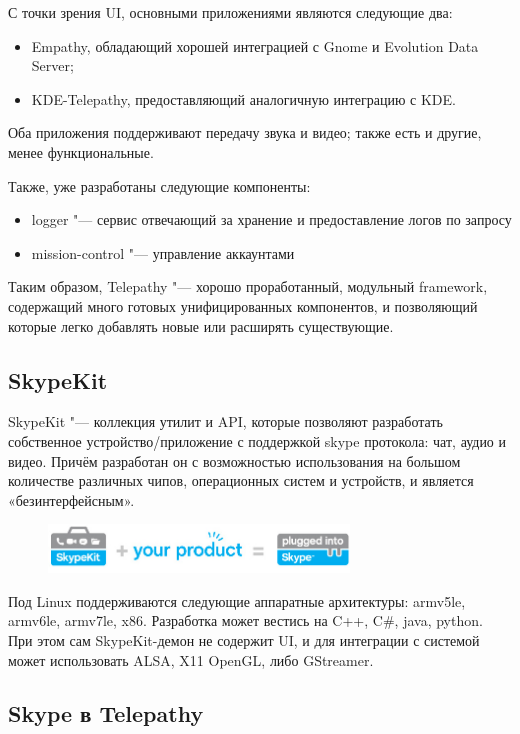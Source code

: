 \documentclass[10pt, a5paper]{article}
\begin{document}
С точки зрения UI, основными приложениями являются следующие два:
\begin{itemize}
\item Empathy, обладающий хорошей интеграцией с Gnome и \linebreak Evolution Data Server;
\item KDE-Telepathy, предоставляющий аналогичную интеграцию с KDE.
\end{itemize}

Оба приложения поддерживают передачу звука и видео; также есть и другие, менее функциональные.

Также, уже разработаны следующие компоненты:
\begin{itemize}
\item logger "--- сервис отвечающий за хранение и предоставление логов по запросу
\item mission-control "--- управление аккаунтами
\end{itemize}

Таким образом, Telepathy "--- хорошо проработанный, модульный framework, содержащий много готовых унифицированных компонентов, и позволяющий которые легко добавлять новые или расширять существующие.

\subsection*{SkypeKit}
SkypeKit "--- коллекция утилит и API, которые позволяют разработать собственное устройство/приложение с поддержкой skype протокола: чат, аудио и видео. Причём разработан он с возможностью использования на большом количестве различных чипов, операционных систем и устройств, и является «безинтерфейсным».
\begin{figure}[b]
  \centering
  \includegraphics[width=8cm]{101_2013_w_Melnikau_skypekit}
\end{figure}
Под Linux поддерживаются следующие аппаратные архитектуры: armv5le,
armv6le, armv7le, x86. Разработка может вестись на C++, C\#, java, python. При этом сам SkypeKit-демон не содержит UI, и для интеграции с системой может использовать ALSA, X11 OpenGL, либо GStreamer.

\subsection*{Skype в Telepathy}
\end{document}
